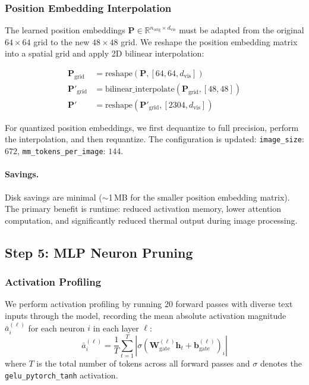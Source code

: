 \documentclass[11pt]{article}
\newcommand{\RR}{\mathbb{R}}
\begin{document}
\subsubsection{Position Embedding Interpolation}

The learned position embeddings $\mathbf{P} \in \RR^{n_{\text{orig}} \times d_{\text{vis}}}$ must be adapted from the original $64\times64$ grid to the new $48\times48$ grid. We reshape the position embedding matrix into a spatial grid and apply 2D bilinear interpolation:

\begin{align}
    \mathbf{P}_{\text{grid}} &= \text{reshape}(\mathbf{P}, [64, 64, d_{\text{vis}}]) \\
    \mathbf{P}'_{\text{grid}} &= \text{bilinear\_interpolate}(\mathbf{P}_{\text{grid}}, [48, 48]) \\
    \mathbf{P}' &= \text{reshape}(\mathbf{P}'_{\text{grid}}, [2304, d_{\text{vis}}])
\end{align}

For quantized position embeddings, we first dequantize to full precision, perform the interpolation, and then requantize. The configuration is updated: \texttt{image\_size}: $672$, \texttt{mm\_tokens\_per\_image}: $144$.

\paragraph{Savings.} Disk savings are minimal ($\sim$1\,MB for the smaller position embedding matrix). The primary benefit is runtime: reduced activation memory, lower attention computation, and significantly reduced thermal output during image processing.

\subsection{Step 5: MLP Neuron Pruning}
\label{sec:neuron}

\subsubsection{Activation Profiling}

We perform activation profiling by running 20 forward passes with diverse text inputs through the model, recording the mean absolute activation magnitude $\bar{a}_i^{(\ell)}$ for each neuron $i$ in each layer $\ell$:
\begin{equation}
    \bar{a}_i^{(\ell)} = \frac{1}{T} \sum_{t=1}^{T} |\sigma(\mathbf{W}_{\text{gate}}^{(\ell)} \mathbf{h}_t + \mathbf{b}_{\text{gate}}^{(\ell)})_i|
\end{equation}
where $T$ is the total number of tokens across all forward passes and $\sigma$ denotes the \texttt{gelu\_pytorch\_tanh} activation.
\end{document}
